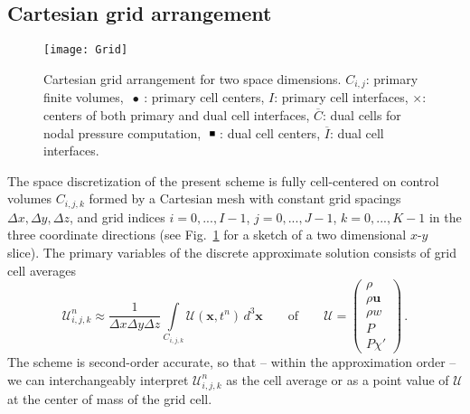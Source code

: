 \documentclass{ametsoc}
\theoremstyle{definition}
\newcommand{\vect}[1]{{\mathbf{#1}}}
\newcommand{\vu}{\vect{u}}
\newcommand{\vx}{\vect{x}}
\newcommand{\dz}{\Delta z}
\newcommand{\chiprime}{{\chi'}}
\newcommand{\Sol}{\mathcal{U}}
\newcommand{\dx}{{\Delta x}}
\newcommand{\dy}{{\Delta y}}
\begin{document}

\label{sec:DiscretizationDetails}


\subsection{Cartesian grid arrangement}
\label{ssec:GridArrangement}


\begin{figure}
\centering
 \texttt{[image: Grid]}
\caption{Cartesian grid arrangement for two space dimensions. 
$C_{i,j}$: primary finite volumes, 
$\ \bullet\ $: primary cell centers, $I$: primary cell interfaces,
$\times$: centers of both primary and dual cell interfaces, 
$\overline{C}$: dual cells for nodal pressure computation, $\ \rule[1pt]{4pt}{4pt}\ $:
dual cell centers, $\overline{I}$: dual cell interfaces.
\label{fig:GridArrangement}}
\end{figure}

The space discretization of the present scheme is fully cell-centered 
on control volumes $C_{i,j,k}$ formed by a Cartesian mesh with constant 
grid spacings $\dx, \dy, \dz$, and grid indices $i = 0, ..., I-1$,  
$j = 0, ..., J-1$, $k = 0, ..., K-1$ in the three coordinate directions
(see Fig.~\ref{fig:GridArrangement} for a sketch of a two dimensional $x$-$y$ slice). 
The primary variables of the discrete approximate solution consists of grid cell 
averages 
%
\begin{equation}
\Sol_{i,j,k}^n \approx 
\frac{1}{\dx \dy \dz}\int\limits_{C_{i,j,k}} \Sol(\vx,t^n)\, d^3\vx
\qquad\text{of}\qquad 
\Sol = \left(
\begin{array}{c}
\rho \\ \rho\vu \\ \rho w \\ P \\ P\chiprime
\end{array}
\right)\,.
\end{equation}
%
The scheme is second-order accurate, so that -- within the approximation
order -- we can interchangeably interpret $\Sol_{i,j,k}^n$ as the cell average
or as a point value of $\Sol$ at the center of mass of the grid 
cell.  
\end{document}
